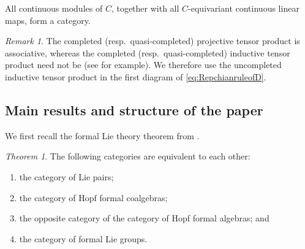 \documentclass[12pt, a4paper]{amsart}
\newcommand{\Ri}{{\mathrm{i}}}
\theoremstyle{Theorem}
\theoremstyle{Theorem}
\theoremstyle{Theorem}
\theoremstyle{Theorem}
\theoremstyle{Plain}
\theoremstyle{remark}
\theoremstyle{remark}
\theoremstyle{Definition}
\newtheorem{thmd}[dfn]{Theorem}
\newtheorem{remarkd}[dfn]{Remark}
\numberwithin{equation}{section}
\begin{document}
All continuous modules of $C$, together with all $C$-equivariant continuous linear maps, form a category.
\begin{remarkd}

The completed (resp.\, quasi-completed) projective tensor product is associative, whereas the completed (resp.\, quasi-completed)  inductive tensor product need not be (see \cite[discussion following Theorem~8.12]{G} for example). We therefore use the uncompleted inductive tensor product in the first diagram of \eqref{eq:RepchianruleofD}.
\end{remarkd}

\subsection{Main results and structure of the paper}

We first recall the formal Lie theory theorem from \cite{CSW4}.
\begin{thmd}\label{thm:equiGqL}
    The following categories are equivalent to each other:
 \begin{enumerate}
  \item the category of Lie pairs;
  \item the category of Hopf formal  coalgebras; 
   \item the opposite category of the category of Hopf formal algebras; and
   \item the category of formal Lie groups.
\end{enumerate}
\end{thmd}
  
\end{document}
